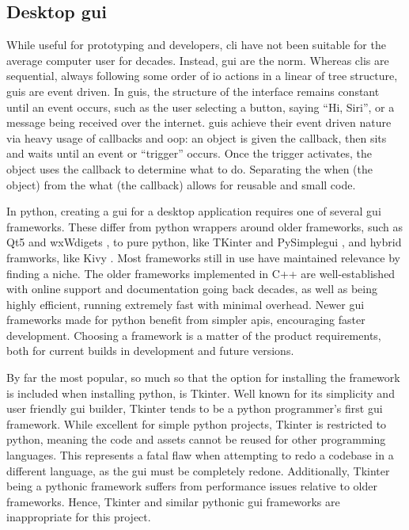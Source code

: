 \documentclass[11pt]{article}
\begin{document}
\inputminted[]{shell}{cli_examples/simple_cli.txt}

\subsection{Desktop \acrshort{gui}}

While useful for prototyping and developers, \acrshort{cli} have not been suitable for the average computer \gls{user} for decades. Instead, \acrfull{gui} are the norm. Whereas \acrshort{cli}s are sequential, always following some order of \acrshort{io} actions in a linear of tree structure, \acrshort{gui}s are event driven. In \acrshort{gui}s, the structure of the interface remains constant until an event occurs, such as the user selecting a button, saying ``Hi, Siri'', or a message being received over the internet. \acrshort{gui}s achieve their event driven nature via heavy usage of callbacks and \acrshort{oop}: an \gls{object} is given the callback, then sits and waits until an event or ``trigger'' occurs. Once the trigger activates, the \gls{object} uses the callback to determine what to do. Separating the when (the \gls{object}) from the what (the callback) allows for reusable and small code.

In \Gls{python}, creating a \acrshort{gui} for a desktop application requires one of several \acrshort{gui} \glspl{framework}. These differ from \Gls{python} wrappers around older \glspl{framework}, such as Qt5 and wxWdigets \cite{qt} \cite{wxwidgets}, to pure python, like TKinter and PySimple\acrshort{gui} \cite{tkinter} \cite{pysimplegui}, and hybrid framworks, like Kivy \cite{kivy}. Most \glspl{framework} still in use have maintained relevance by finding a niche. The older \glspl{framework} implemented in C++ are well-established with online support and documentation going back decades, as well as being highly efficient, running extremely fast with minimal overhead. Newer \acrshort{gui} \glspl{framework} made for \Gls{python} benefit from simpler \acrshort{api}s, encouraging faster development. Choosing a \gls{framework} is a matter of the product requirements, both for current builds in development and future versions.

By far the most popular, so much so that the option for installing the \gls{framework} is included when installing \Gls{python}, is Tkinter. Well known for its simplicity and \gls{user} friendly \acrshort{gui} builder, Tkinter tends to be a \Gls{python} programmer's first \acrshort{gui} \gls{framework}. While excellent for simple \Gls{python} projects, Tkinter is restricted to \Gls{python}, meaning the code and assets cannot be reused for other programming languages. This represents a fatal flaw when attempting to redo a codebase in a different language, as the \acrshort{gui} must be completely redone. Additionally, Tkinter being a \Gls{python}ic \gls{framework} suffers from performance issues relative to older \glspl{framework}. Hence, Tkinter and similar \Gls{python}ic \acrshort{gui} \glspl{framework} are inappropriate for this project.
\end{document}
